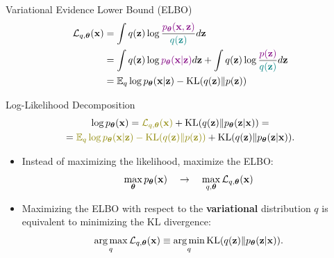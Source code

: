 \documentclass{beamer}
\renewcommand{\eqpause}{}
\renewcommand{\nextonslide}[1]{#1}
\begin{document}
\begin{frame}{Variational Evidence Lower Bound (ELBO)}
	\vspace{-0.3cm}
	\begin{align*}
		\cL_{q, \btheta}(\bx) &= \int q(\bz) \log \frac{\color{violet}\pt(\bx, \bz)}{\color{teal}q(\bz)}d\bz \\ 
		\nextonslide{&= \int q(\bz) \log {\color{violet}\pt(\bx | \bz)} d\bz + \int q(\bz) \log \frac{\color{violet}p(\bz)}{\color{teal}q(\bz)}d\bz} \\ 
		\nextonslide{&= \bbE_{q} \log \pt(\bx | \bz) - \KL (q(\bz) \| p(\bz))}
	\end{align*}
    \eqpause
	\vspace{-0.5cm}
	\begin{block}{Log-Likelihood Decomposition}
		\vspace{-0.8cm}
		\begin{multline*}
			\log \pt(\bx) = {\color{olive}\cL_{q, \btheta}(\bx)} + \KL(q(\bz) \| \pt(\bz|\bx)) 
			\nextonslide{ = \\ = {\color{olive}\bbE_{q} \log \pt(\bx | \bz) - \KL (q(\bz) \| p(\bz))} + \KL(q(\bz) \| \pt(\bz|\bx)).}
		\end{multline*}
		\vspace{-0.7cm}
	\end{block}
    \eqpause
	\begin{itemize}
		\item Instead of maximizing the likelihood, maximize the ELBO:
		\[
		\max_{\boldsymbol{\theta}} p_{\boldsymbol{\theta}}(\mathbf{x}) \quad \rightarrow \quad \max_{q, \boldsymbol{\theta}} \mathcal{L}_{q, \boldsymbol{\theta}}(\mathbf{x})
		\]
        \eqpause
		\vspace{-0.3cm}
		\item Maximizing the ELBO with respect to the \textbf{variational} distribution $q$ is equivalent to minimizing the KL divergence:
		\[
		\operatorname*{arg\,max}_q \mathcal{L}_{q, \boldsymbol{\theta}}(\mathbf{x}) \equiv \operatorname*{arg\,min}_q \mathrm{KL}(q(\mathbf{z}) \| p_{\boldsymbol{\theta}}(\mathbf{z}|\mathbf{x})).
		\]
	\end{itemize}
\end{frame}
\end{document}
